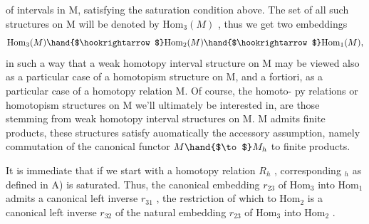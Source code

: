  of intervals in M, satisfying the saturation condition above. The
 set of all such structures on M will be denoted by $\mathrm{Hom}_3(M)$ , thus
we get two embeddings
\[ \mathrm{Hom}_3(M)\hand{$\hookrightarrow$}\mathrm{Hom}_2(M)\hand{$\hookrightarrow$}\mathrm{Hom}_1(M), \]
in such a way that a weak homotopy interval structure on M may be viewed
also as a particular case of a homotopism structure on M, and a fortiori,
as a particular case of a homotopy relation  M. Of course, the homoto-%
py relations or homotopism structures on M we'll ultimately be interested
in, are those stemming from weak homotopy interval structures on M. 
 M admits finite products,  these structures satisfy auomatically the
accessory assumption, namely commutation of the canonical functor $M\hand{$\to$}M_h$
to finite products.

It is immediate that if we start with a homotopy relation $R_h$ , 
corresponding \hand{$\Sigma$}$_h$ as defined in A) is saturated. Thus, the canonical
embedding $r_{23}$ of $\mathrm{Hom}_3$ into $\mathrm{Hom}_1$ admits a canonical left inverse $r_{31}$ ,
the restriction of which to $\mathrm{Hom}_2$ is a canonical left inverse $r_{32}$ of the
natural embedding $r_{23}$ of $\mathrm{Hom}_3$ into $\mathrm{Hom}_2$ .

